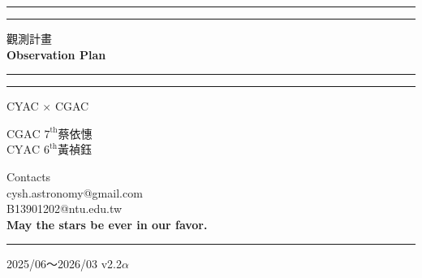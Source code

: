 \documentclass[12pt]{article}
\begin{document}


\begin{center}
    \rule{\textwidth}{1.6pt}\vspace*{-\baselineskip}\vspace*{2pt} 
    \rule{\textwidth}{0.4pt} 
    
    \vspace{0.75\baselineskip} 
        
    {\LARGE 觀測計畫\\}
    \vspace{0.3\baselineskip} 
    {\LARGE \textbf{Observation Plan}}
    
    \vspace{0.75\baselineskip} 
    
    \rule{\textwidth}{0.4pt}\vspace*{-\baselineskip}\vspace{3.2pt} 
    \rule{\textwidth}{1.6pt} 
    
    \vspace{0.5\baselineskip}
    
    CYAC \(\times\) CGAC
    
    \vspace{2\baselineskip}
    \(\text{CGAC }7^{\text{th}}\)\text{ }蔡依憓\\
    \(\text{CYAC }6^{\text{th}}\)\text{ }黃禎鈺\\
    
    
    \vfill
    
    Contacts\\
    cysh.astronomy@gmail.com\\
    B13901202@ntu.edu.tw\\
    \vspace{\baselineskip}
    \textbf{May the stars be ever in our favor.}
    
    \rule{\textwidth}{0.6pt} 
    2025/06\text{ }～\text{ }2026/03 v2.2\(\alpha\)
    
\end{center}
\end{document}
